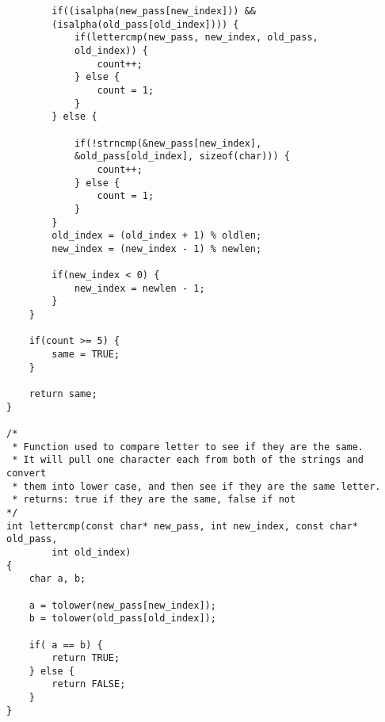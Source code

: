 \documentclass[12pt,letterpaper]{article}
\begin{document}
\begin{lstlisting}
		if((isalpha(new_pass[new_index])) &&
		(isalpha(old_pass[old_index]))) {
			if(lettercmp(new_pass, new_index, old_pass,
			old_index)) {
				count++;
			} else {
				count = 1;
			}
		} else {

			if(!strncmp(&new_pass[new_index],
			&old_pass[old_index], sizeof(char))) {
				count++;
			} else {
				count = 1;
			}
		}
		old_index = (old_index + 1) % oldlen;
		new_index = (new_index - 1) % newlen;

		if(new_index < 0) {
			new_index = newlen - 1;
		}
	}

	if(count >= 5) {
		same = TRUE;
	}
	
	return same;
}

/*
 * Function used to compare letter to see if they are the same.
 * It will pull one character each from both of the strings and convert
 * them into lower case, and then see if they are the same letter.
 * returns: true if they are the same, false if not
*/
int lettercmp(const char* new_pass, int new_index, const char* old_pass,
		int old_index)
{
	char a, b;

	a = tolower(new_pass[new_index]);
	b = tolower(old_pass[old_index]);

	if( a == b) {
		return TRUE;
	} else {
		return FALSE;
	}
}

\end{lstlisting}
\end{document}
